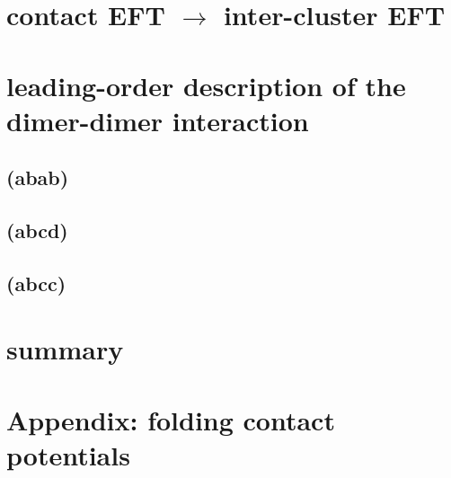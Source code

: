 \documentclass[preprint,aps,onecolumn,preprintnumbers,amsmath,amssymb,nofootinbib,superscriptaddress]{revtex4-1}
\begin{document}
\section{contact EFT $\to$ inter-cluster EFT}

\section{leading-order description of the dimer-dimer interaction}

\subsection{(abab)}
\subsection{(abcd)}
\subsection{(abcc)}

\section{summary}

\section{Appendix: folding contact potentials}



\end{document}
